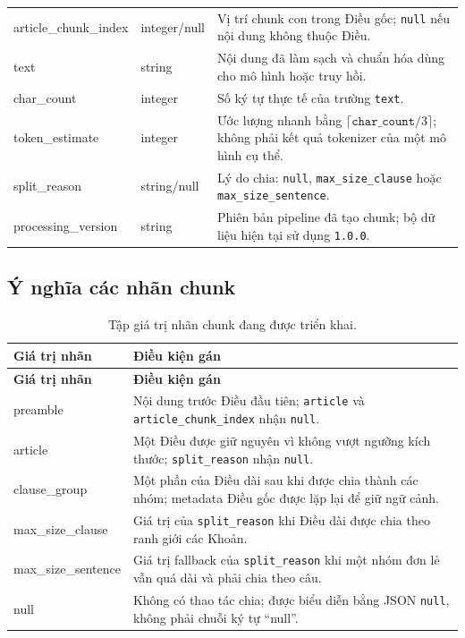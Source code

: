\documentclass[12pt,a4paper]{article}
\newcommand{\code}[1]{\texttt{#1}}
\newcommand{\nullvalue}{\texttt{null}}
\begin{document}
\begin{longtable}{>{\ttfamily}p{3.5cm}p{2.7cm}p{7.6cm}}
article\_chunk\_index & integer/null & Vị trí chunk con trong Điều gốc; \nullvalue{} nếu nội dung không thuộc Điều. \\
text & string & Nội dung đã làm sạch và chuẩn hóa dùng cho mô hình hoặc truy hồi. \\
char\_count & integer & Số ký tự thực tế của trường \code{text}. \\
token\_estimate & integer & Ước lượng nhanh bằng $\lceil\texttt{char\_count}/3\rceil$; không phải kết quả tokenizer của một mô hình cụ thể. \\
split\_reason & string/null & Lý do chia: \nullvalue{}, \code{max\_size\_clause} hoặc \code{max\_size\_sentence}. \\
processing\_version & string & Phiên bản pipeline đã tạo chunk; bộ dữ liệu hiện tại sử dụng \code{1.0.0}. \\
\bottomrule
\end{longtable}

\subsection{Ý nghĩa các nhãn chunk}

\begin{longtable}{>{\ttfamily}p{3.8cm}p{10.0cm}}
\caption{Tập giá trị nhãn chunk đang được triển khai.}\label{tab:chunk-labels}\\
\toprule
\normalfont\textbf{Giá trị nhãn} & \textbf{Điều kiện gán} \\
\midrule
\endfirsthead
\toprule
\normalfont\textbf{Giá trị nhãn} & \textbf{Điều kiện gán} \\
\midrule
\endhead
preamble & Nội dung trước Điều đầu tiên; \code{article} và \code{article\_chunk\_index} nhận \nullvalue{}. \\
article & Một Điều được giữ nguyên vì không vượt ngưỡng kích thước; \code{split\_reason} nhận \nullvalue{}. \\
clause\_group & Một phần của Điều dài sau khi được chia thành các nhóm; metadata Điều gốc được lặp lại để giữ ngữ cảnh. \\
max\_size\_clause & Giá trị của \code{split\_reason} khi Điều dài được chia theo ranh giới các Khoản. \\
max\_size\_sentence & Giá trị fallback của \code{split\_reason} khi một nhóm đơn lẻ vẫn quá dài và phải chia theo câu. \\
null & Không có thao tác chia; được biểu diễn bằng JSON \nullvalue{}, không phải chuỗi ký tự ``null''. \\
\bottomrule
\end{longtable}
\end{document}
